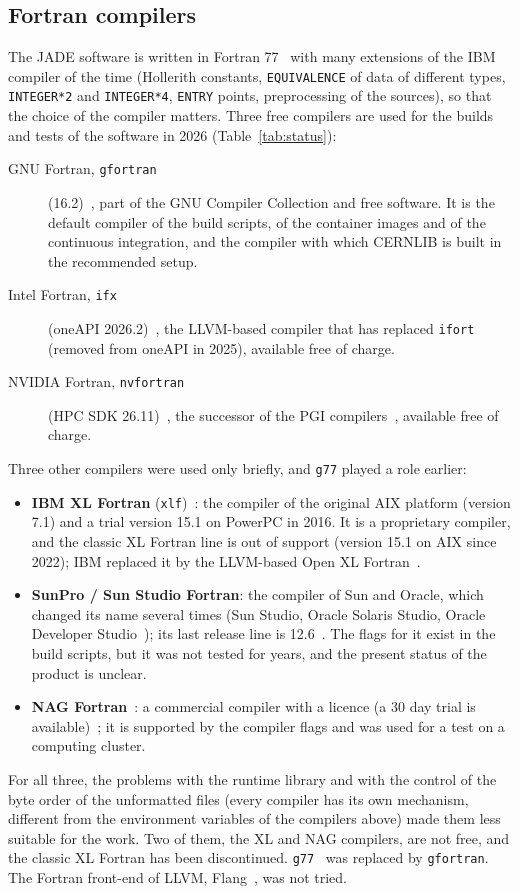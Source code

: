 \subsection{Fortran compilers}
\label{sec:fcompilers}
The JADE software is written in Fortran 77~\cite{Wiki:Fortran} with many extensions of the IBM compiler of the time
(Hollerith constants, \texttt{EQUIVALENCE} of data of different types, \texttt{INTEGER*2} and \texttt{INTEGER*4},
\texttt{ENTRY} points, preprocessing of the sources), so that the choice of the compiler matters. Three free
compilers are used for the builds and tests of the software in 2026 (Table~\ref{tab:status}):
\begin{description}
\item[GNU Fortran, \texttt{gfortran}] (16.2)~\cite{GFortran:web,Wiki:GFortran}, part of the GNU Compiler
Collection and free software. It is the default compiler of the build scripts, of the container images and of the continuous
integration, and the compiler with which CERNLIB is built in the recommended setup.
\item[Intel Fortran, \texttt{ifx}] (oneAPI 2026.2)~\cite{Intel:ifx,Wiki:IntelFortran}, the LLVM-based compiler that has
replaced \texttt{ifort} (removed from oneAPI in 2025), available free of charge.
\item[NVIDIA Fortran, \texttt{nvfortran}] (HPC SDK 26.11)~\cite{NVIDIA:HPCSDK}, the successor of the PGI
compilers~\cite{Wiki:PGI}, available free of charge.
\end{description}
Three other compilers were used only briefly, and \texttt{g77} played a role earlier:
\begin{itemize}
\item \textbf{IBM XL Fortran} (\texttt{xlf})~\cite{Wiki:XLFortran}: the compiler of the original AIX platform (version 7.1) and a trial
version 15.1 on PowerPC in 2016. It is a proprietary compiler, and the classic XL Fortran line is out of support (version 15.1 on AIX
since 2022); IBM replaced it by the LLVM-based Open XL Fortran~\cite{IBM:OpenXL}.
\item \textbf{SunPro / Sun Studio Fortran}: the compiler of Sun and Oracle, which changed its name several times (Sun Studio, Oracle Solaris
Studio, Oracle Developer Studio~\cite{Wiki:OracleDevStudio}); its last release line is 12.6~\cite{Oracle:DevStudioMatrix}. The flags for it exist
in the build scripts, but it was not tested for years, and the present status of the product is unclear.
\item \textbf{NAG Fortran}~\cite{Wiki:NAG}: a commercial compiler with a licence (a 30 day trial is available)~\cite{NAG:Fortran}; it is
supported by the compiler flags and was used for a test on a computing cluster.
\end{itemize}
For all three, the problems with the runtime library and with the control of the byte order of the unformatted files (every compiler has its own
mechanism, different from the environment variables of the compilers above) made them less suitable for the work. Two of them, the XL and
NAG compilers, are not free, and the classic XL Fortran has been discontinued. \texttt{g77}~\cite{Wiki:G77} was replaced by \texttt{gfortran}.
The Fortran front-end of LLVM, Flang~\cite{LLVM:Flang}, was not tried.

